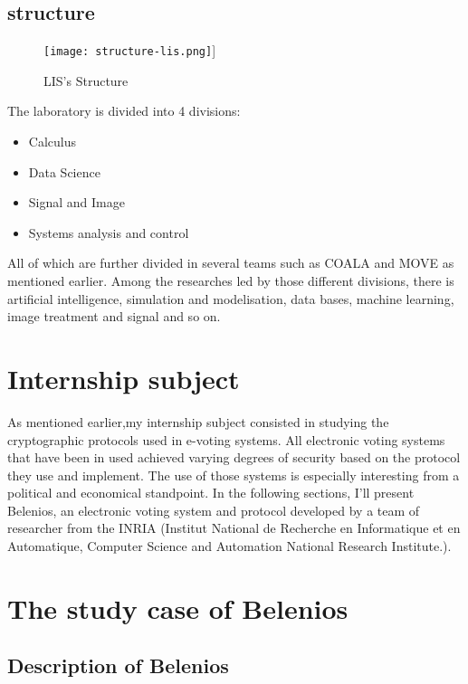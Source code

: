 \documentclass[12pt, a4paper]{report}
\begin{document}
\subsection{structure}

\begin{figure}[H]
\texttt{[image: structure-lis.png]}]
\caption{LIS's Structure}
\label{Lis organisation}
\end{figure}

The laboratory is divided into 4 divisions:
\begin{itemize}
\item Calculus
\item Data Science
\item Signal and Image
\item Systems analysis and control
\end{itemize}

All of which are further divided in several teams such as COALA and MOVE as mentioned earlier.
Among the researches led by those different divisions, there is artificial intelligence, simulation and modelisation, data bases, machine learning, image treatment and signal and so on.


\section{Internship subject}

As mentioned earlier,my internship subject consisted in studying the cryptographic protocols used in e-voting systems. All electronic voting systems that have been in used achieved varying degrees of security based on the protocol they use and implement. The use of those systems is especially interesting from a political and economical standpoint. In the following sections, I'll present Belenios, an electronic voting system and protocol developed by a team of researcher from the INRIA (Institut National de Recherche en Informatique et en Automatique, Computer Science and Automation National Research Institute.).

\section{The study case of Belenios}

\subsection{Description of Belenios}
\end{document}
